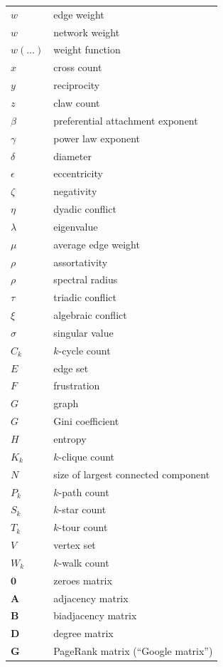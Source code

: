 \documentclass{article}
\begin{document}
\begin{longtable}{ll}
  $w$ & edge weight \\ 
  $w$ & network weight \\
  $w(\ldots)$ & weight function \\
  $x$ & cross count \\
  $y$ & reciprocity \\
  $z$ & claw count \\
\midrule
  $\beta$  & preferential attachment exponent \\
  $\gamma$ & power law exponent \\
  $\delta$ & diameter \\
  $\epsilon$ & eccentricity \\
  $\zeta$ & negativity \\
  $\eta$ & dyadic conflict \\
  $\lambda$ & eigenvalue \\
  $\mu$  & average edge weight \\
  $\rho$ & assortativity \\
  $\rho$ & spectral radius \\
  $\tau$ & triadic conflict \\
  $\xi$  & algebraic conflict \\
  $\sigma$ & singular value \\
\midrule
  $C_k$ & $k$-cycle count \\
  $E$ & edge set \\
  $F$ & frustration \\
  $G$ & graph \\
  $G$ & Gini coefficient \\
  $H$ & entropy \\
  $K_k$ & $k$-clique count \\
  $N$   & size of largest connected component\\
  $P_k$ & $k$-path count \\
  $S_k$ & $k$-star count \\
  $T_k$ & $k$-tour count \\
  $V$   & vertex set \\
  $W_k$ & $k$-walk count \\
\midrule
  $\mathbf 0$ & zeroes matrix \\
  $\mathbf A$ & adjacency matrix \\
  $\mathbf B$ & biadjacency matrix \\
  $\mathbf D$ & degree matrix \\
  $\mathbf G$ & PageRank matrix (``Google matrix'') \\

\end{longtable}
\end{document}
